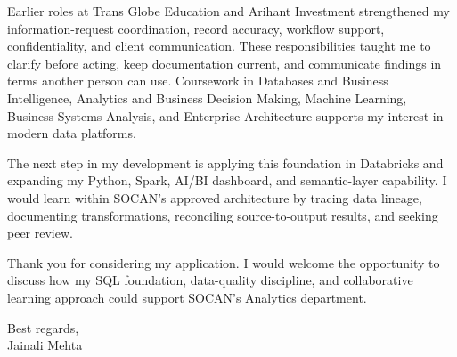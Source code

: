 \documentclass[letterpaper,11pt]{article}
\begin{document}
\bigbreak
Earlier roles at Trans Globe Education and Arihant Investment strengthened my information-request coordination, record accuracy, workflow support, confidentiality, and client communication. These responsibilities taught me to clarify before acting, keep documentation current, and communicate findings in terms another person can use. Coursework in Databases and Business Intelligence, Analytics and Business Decision Making, Machine Learning, Business Systems Analysis, and Enterprise Architecture supports my interest in modern data platforms.

\bigbreak
The next step in my development is applying this foundation in Databricks and expanding my Python, Spark, AI/BI dashboard, and semantic-layer capability. I would learn within SOCAN's approved architecture by tracing data lineage, documenting transformations, reconciling source-to-output results, and seeking peer review.

\bigbreak
Thank you for considering my application. I would welcome the opportunity to discuss how my SQL foundation, data-quality discipline, and collaborative learning approach could support SOCAN's Analytics department.

\bigbreak
Best regards,\\
Jainali Mehta
\end{document}
